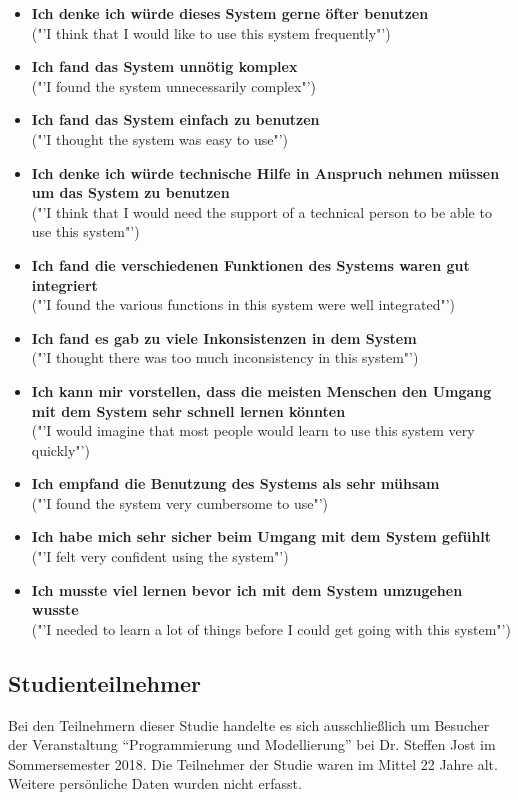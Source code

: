 \documentclass[11pt,a4paper,twoside,ngerman]{article}
\begin{document}
\begin{itemize}
    \item \textbf{Ich denke ich würde dieses System gerne öfter benutzen} \\ ("'I think that I would like to use this system frequently"')
    \item \textbf{Ich fand das System unnötig komplex} \\ ("'I found the system unnecessarily complex"')
    \item \textbf{Ich fand das System einfach zu benutzen} \\ ("'I thought the system was easy to use"')
    \item \textbf{Ich denke ich würde technische Hilfe in Anspruch nehmen müssen um das System zu benutzen} \\ ("'I think that I would need the support of a technical person to be able to use this system"')
    \item \textbf{Ich fand die verschiedenen Funktionen des Systems waren gut integriert} \\ ("'I found the various functions in this system were well integrated"')
    \item \textbf{Ich fand es gab zu viele Inkonsistenzen in dem System} \\ ("'I thought there was too much inconsistency in this system"')
    \item \textbf{Ich kann mir vorstellen, dass die meisten Menschen den Umgang mit dem System sehr schnell lernen könnten} \\ ("'I would imagine that most people would learn to use this system very quickly"')
    \item \textbf{Ich empfand die Benutzung des Systems als sehr mühsam} \\ ("'I found the system very cumbersome to use"')
    \item \textbf{Ich habe mich sehr sicher beim Umgang mit dem System gefühlt} \\ ("'I felt very confident using the system"')
    \item \textbf{Ich musste viel lernen bevor ich mit dem System umzugehen wusste} \\ ("'I needed to learn a lot of things before I could get going with this system"')
\end{itemize}

\subsection{Studienteilnehmer} \label{sec:studyparticipants}
Bei den Teilnehmern dieser Studie handelte es sich ausschließlich um Besucher der Veranstaltung "`Programmierung und Modellierung"' bei Dr. Steffen Jost im Sommersemester 2018.
Die Teilnehmer der Studie waren im Mittel 22 Jahre alt. Weitere persönliche Daten wurden nicht erfasst.
\end{document}
